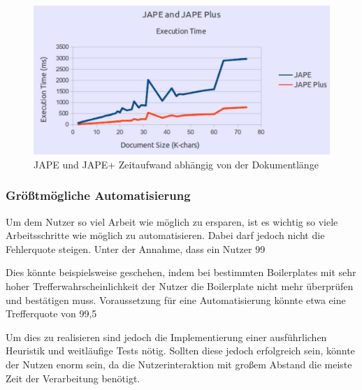 \documentclass[12pt]{report}
\begin{document}
\begin{figure}[H]
\begin{center}
\includegraphics[scale=0.7]{Bilder/TransducerTest.jpg}
\caption{JAPE und JAPE+ Zeitaufwand abhängig von der Dokumentlänge \cite{gm19}}
\end{center}
\end{figure}

\subsubsection{Größtmögliche Automatisierung}
Um dem Nutzer so viel Arbeit wie möglich zu ersparen, ist es wichtig so viele Arbeitsschritte wie möglich zu automatisieren. Dabei darf jedoch nicht die Fehlerquote steigen. Unter der Annahme, dass ein Nutzer 99%

Dies könnte beispielsweise geschehen, indem bei bestimmten Boilerplates mit sehr hoher Trefferwahrscheinlichkeit der Nutzer die Boilerplate nicht mehr überprüfen und bestätigen muss. Voraussetzung für eine Automatisierung könnte etwa eine Trefferquote von 99,5%

Um dies zu realisieren sind jedoch die Implementierung einer ausführlichen Heuristik und weitläufige Tests nötig. Sollten diese jedoch erfolgreich sein, könnte der Nutzen enorm sein, da die Nutzerinteraktion mit großem Abstand die meiste Zeit der Verarbeitung benötigt.
\end{document}
